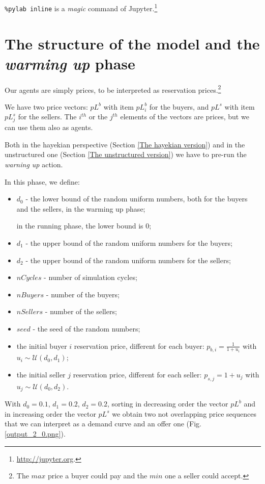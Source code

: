 \documentclass[12pt]{report}
\begin{document}
\verb|%pylab inline| 
is a \emph{magic} command of Jupyter.\footnote{\url{http://jupyter.org}.}

\section{The structure of the model and the \emph{warming up} phase}\label{The structure of the model}

Our agents are simply prices, to be interpreted as reservation prices.\footnote{The $max$ price a buyer could pay and the $min$ one a seller could accept.}

We have two price vectors: $pL^b$ with item $pL^b_i$ for the buyers, and $pL^s$ with item $pL^s_j$ for the sellers. The $i^{th}$ or the $j^{th}$ elements of the vectors are prices, but  we can use them also as agents.

Both in the hayekian perspective (Section \ref{The hayekian version}) and in the unstructured one (Section \ref{The unstructured version}) we have to pre-run the \emph{warning up} action.

In this phase, we define:

\begin{itemize}
\item $d_0$ - the lower bound of the random uniform numbers, both for the buyers and the sellers, in the warming up phase; 

in the running phase, the lower bound is $0$;
\item $d_1$ - the upper bound of the random uniform numbers for the buyers;
\item $d_2$ - the upper bound of the random uniform numbers for the sellers;
\item $nCycles$ - number of simulation cycles;
\item $nBuyers$  - number of the buyers;
\item $nSellers$ - number of the sellers;
\item $seed$ - the seed of the random numbers;
\item the initial buyer $i$ reservation price, different for each buyer: $p_{b,i}=\frac{1} {1 + u_i}$ with $u_i\sim\mathcal{U}(d_0,d_1)$;
\item the initial seller $j$ reservation price, different for each seller: $p_{s,j}=1 + u_j$ with $u_j\sim\mathcal{U}(d_0,d_2)$.
\end{itemize}

With  $d_0=0.1$, $d_1=0.2$, $d_2=0.2$, sorting in decreasing order the vector  $pL^b$ and in increasing order the vector  $pL^s$ we obtain two not overlapping price sequences that we can interpret as a demand curve and an offer one (Fig. \ref{output_2_0.png}).
\end{document}
